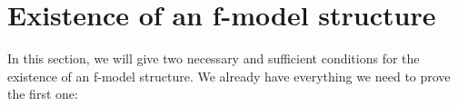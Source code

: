 \documentclass{amsart}
\theoremstyle{definition}
\newcommand{\cat}[1]{\mathbf{#1}}
\newcommand{\C}{\cat{C}}
\newcommand{\cyli}{i}
\begin{document}
\begin{comment}
Now, we need to prove a technical lemma.
We will need this lemma later, so we define it in a general form which applies to every category.
\begin{lem}
Let $\C$ be a finitely cocomplete category and let $i : U \to V$ be a morphism of $\C$ with a system of cylinders for it.
If $f : X \to Y$ and $g : Y \to Z$ are morphisms of $\C$ such that $f$ has RLP up to $\sim$ with respect to $U$ and
$g \circ f$ has RLP up to $\sim_i$ with respect to $i$, then $f$ also has RLP up to $\sim_i$ with respect to $i$.
\end{lem}
\begin{proof}
Suppose that we have a commutative square as below.
Then there exists a map $u_x : U \to X$ and a homotopy $h : C(U) \to Y$ between $f \circ u_x$ and $u$.
\[ \xymatrix{   \ar@{}[dr]|(.7){\sim}                 & X \ar[d]^f \\
              U \ar@{-->}[ur]^{u_x} \ar[d]_i \ar[r]_u & Y \ar[d]^g \\
              V \ar[r]_v                              & Z
            } \]
The map $g \circ h$ is a homotopy between $g \circ f \circ u_x$ and $v \circ i$.
By the homotopy extension property, we have a map $v_z : V \to Z$ and a homotopy $h_z : C(V) \to Z$ between $v_z$ and $v$.
Consider the following diagram:
\[ \xymatrix{ U \ar[r]^{u_x} \ar[d]_i \ar@{}[dr]|(.7){\sim_i} & X \ar[d]^{g \circ f} \\
              V \ar[r]_{v_z} \ar@{-->}[ur]^{v_x}              & Z.
            } \]
By assumption on $g \circ f$, we have a lift $v_x : V \to X$ together
with a homotopy $h_1 : C_U(V) \to Z$ between $g \circ f \circ v_x$ and $v_z$.

Note that $h \circ \cyli_0 = f \circ v_x \circ i$.
By the homotopy extension property, we have a map $v_y : V \to Y$ and a homotopy $h_y : C(V) \to Y$ between $f \circ v_x$ and $v_y$.
Now, we have map $[h_z, g \circ h_y, h_1] : C(V) \amalg_{C(U)} C(V) \amalg_{V \amalg_U V} C_U(V) \to Z$.
By condition~\eqref{it:comp}, we have a map $h_2 : C_U(V) \to Z$ which gives us a homotopy between $g \circ v_y$ and $v$.
Thus $v_y$ is a required lift.
\end{proof}
\end{comment}

\section{Existence of an f-model structure}

In this section, we will give two necessary and sufficient
conditions for the existence of an f-model structure.
We already have everything we need to prove the first one:
\end{document}
